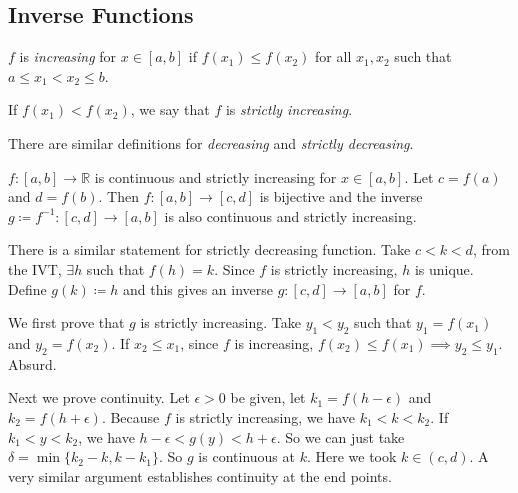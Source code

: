 \subsection{Inverse Functions}
\leavevmode
\begin{definition}
    \(f\) is \textit{increasing} for \(x \in [a,b]\) if \(f(x_1) \leq f(x_2)\) for all \(x_1, x_2\) such that \(a\leq x_1 < x_2 \leq b\).

    If \(f(x_1) < f(x_2)\), we say that \(f\) is \textit{strictly increasing}.

    There are similar definitions for \textit{decreasing} and \textit{strictly decreasing}.
\end{definition}
\begin{theorem}
    \(f: [a,b] \to \mathbb{R}\) is continuous and strictly increasing for \(x \in [a,b]\). Let \( c = f(a)\) and \(d = f(b)\). Then \(f: [a,b] \to [c,d]\) is bijective and the inverse \(g\coloneqq f^{-1}:[c,d] \to [a,b]\) is also continuous and strictly increasing.
\end{theorem}
\begin{remark}
    There is a similar statement for strictly decreasing function. Take \(c < k < d\), from the IVT, \(\exists h \) such that \(f(h) = k\). Since \(f\) is strictly increasing, \(h\) is unique. Define \(g(k) \coloneqq h\) and this gives an inverse \(g: [c,d] \to [a,b]\) for \(f\).

    We first prove that \(g\) is strictly increasing. Take \(y_1 < y_2\) such that \(y_1 = f(x_1)\) and \(y_2 = f(x_2)\). If \(x_2 \leq x_1\), since \(f\) is increasing, \(f(x_2) \leq  f(x_1) \implies y_2 \leq y_1\). Absurd.

    Next we prove continuity. Let \(\epsilon >0\) be given, let \(k_1 = f(h - \epsilon)\) and \(k_2 = f(h + \epsilon)\). Because \(f\) is strictly increasing, we have \( k_1 < k < k_2\). If \(k_1 < y<k_2\), we have \(h-\epsilon<g(y) < h + \epsilon\). So we can just take \(\delta=\min\{k_2 - k, k-k_1\}\). So \(g\) is continuous at \(k\). Here we took \(k \in (c,d)\). A very similar argument establishes continuity at the end points.
\end{remark}